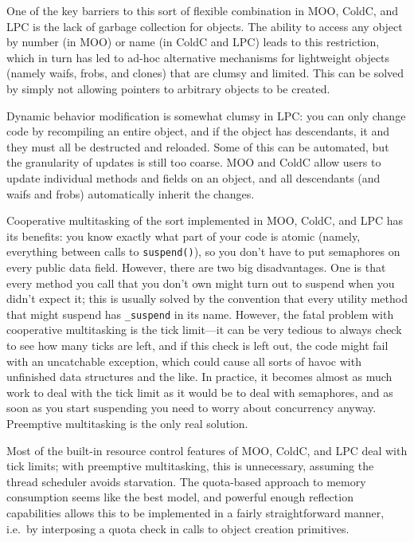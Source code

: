 \documentclass{article}
\begin{document}
One of the key barriers to this sort of flexible combination in MOO,
ColdC, and LPC is the lack of garbage collection for objects.  The
ability to access any object by number (in MOO) or name (in ColdC and
LPC) leads to this restriction, which in turn has led to ad-hoc
alternative mechanisms for lightweight objects (namely waifs, frobs,
and clones) that are clumsy and limited.  This can be solved by simply 
not allowing pointers to arbitrary objects to be created.

Dynamic behavior modification is somewhat clumsy in LPC: you can only
change code by recompiling an entire object, and if the object has
descendants, it and they must all be destructed and reloaded.  Some of 
this can be automated, but the granularity of updates is still too
coarse.  MOO and ColdC allow users to update individual methods and
fields on an object, and all descendants (and waifs and frobs)
automatically inherit the changes.

Cooperative multitasking of the sort implemented in MOO, ColdC, and
LPC has its benefits: you know exactly what part of your code is
atomic (namely, everything between calls to \texttt{suspend()}), so
you don't have to put semaphores on every public data field.  However,
there are two big disadvantages.  One is that every method you call
that you don't own might turn out to suspend when you didn't expect
it; this is usually solved by the convention that every utility
method that might suspend has \texttt{\_suspend} in its name.  However, 
the fatal problem with cooperative multitasking is the tick limit---it 
can be very tedious to always check to see how many ticks are left,
and if this check is left out, the code might fail with an uncatchable 
exception, which could cause all sorts of havoc with unfinished data
structures and the like.  In practice, it becomes almost as much work
to deal with the tick limit as it would be to deal with semaphores, and
as soon as you start suspending you need to worry about concurrency
anyway.  Preemptive multitasking is the only real solution.

Most of the built-in resource control features of MOO, ColdC, and LPC
deal with tick limits; with preemptive multitasking, this is
unnecessary, assuming the thread scheduler avoids starvation.  The
quota-based approach to memory consumption seems like the best model,
and powerful enough reflection capabilities allows this to be
implemented in a fairly straightforward manner, i.e.~by interposing a
quota check in calls to object creation primitives.
\end{document}
